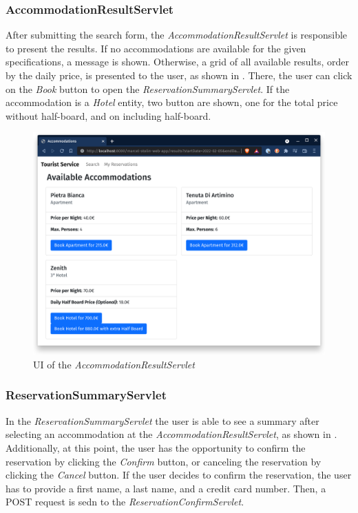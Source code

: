 \subsubsection{AccommodationResultServlet}\label{sec:02_design_web_results}
After submitting the search form, the \textit{AccommodationResultServlet} is responsible to present the results.
If no accommodations are available for the given specifications, a message is shown.
Otherwise, a grid of all available results, order by the daily price, is presented to the user, as shown in . There, the user can click on the \textit{Book} button to open the \textit{ReservationSummaryServlet}. If the accommodation is a \textit{Hotel} entity, two button are shown, one for the total price without half-board, and on including half-board.
\begin{figure}[h]
\centering
\includegraphics[scale=0.14]{images/02_design/web-app-results}
\caption{UI of the \textit{AccommodationResultServlet}}
\label{fig:02_design_web_results_page}
\end{figure}

\newpage
\subsubsection{ReservationSummaryServlet}\label{sec:02_design_web_reservationsummary}
In the \textit{ReservationSummaryServlet} the user is able to see a summary after selecting an accommodation at the \textit{AccommodationResultServlet}, as shown in .
Additionally, at this point, the user has the opportunity to confirm the reservation by clicking the \textit{Confirm} button, or canceling the reservation by clicking the \textit{Cancel} button.
If the user decides to confirm the reservation, the user has to provide a first name, a last name, and a credit card number. Then, a POST request is sedn to the \textit{ReservationConfirmServlet}.

